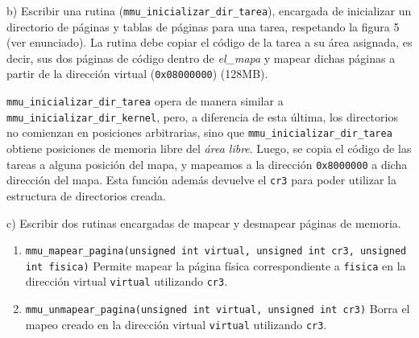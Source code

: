 \noindent
b) Escribir una rutina (\verb|mmu_inicializar_dir_tarea|), encargada de inicializar un directorio de páginas y tablas de páginas para una tarea, respetando la figura 5 (ver enunciado). La rutina debe copiar el código de la tarea a su área asignada, es decir, sus dos páginas de código dentro de \textit{el_mapa} y mapear dichas páginas a partir de la dirección virtual (\verb|0x08000000|) (128MB).

\vspace*{0.3cm}

\verb|mmu_inicializar_dir_tarea| opera de manera similar a \verb|mmu_inicializar_dir_kernel|, pero, a diferencia 
de esta \'ultima, los directorios no comienzan en posiciones arbitrarias, sino que \verb|mmu_inicializar_dir_tarea| 
obtiene posiciones de memoria libre del \textit{\'area libre}. Luego, se copia el c\'odigo de las tareas a alguna 
posici\'on del mapa, y mapeamos a la direcci\'on \verb|0x8000000| a dicha direcci\'on del mapa. Esta funci\'on adem\'as 
devuelve el \verb|cr3| para poder utilizar la estructura de directorios creada.

\vspace*{0.5cm} \noindent



\noindent
c) Escribir dos rutinas encargadas de mapear y desmapear páginas de memoria.

\begin{enumerate}
  \item \verb|mmu_mapear_pagina(unsigned int virtual, unsigned int cr3, unsigned int fisica)| \newline
  Permite mapear la página física correspondiente a \verb|fisica| en la dirección virtual \verb|virtual| utilizando \verb|cr3|.
  
  \item \verb|mmu_unmapear_pagina(unsigned int virtual, unsigned int cr3)| \newline
  Borra el mapeo creado en la dirección virtual \verb|virtual| utilizando \verb|cr3|.
\end{enumerate}

\vspace*{0.3cm}

